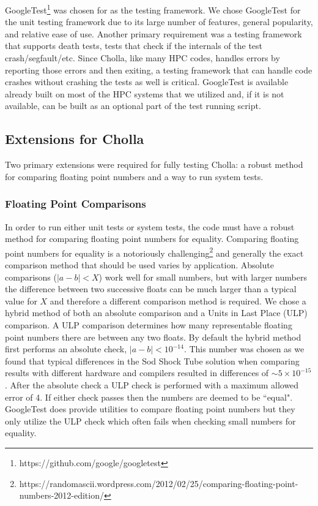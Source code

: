 GoogleTest\footnote{https://github.com/google/googletest} was chosen for as the testing framework. We chose GoogleTest for the unit testing framework due to its large number of features, general popularity, and relative ease of use. Another primary requirement was a testing framework that supports death tests, tests that check if the internals of the test crash/segfault/etc. Since Cholla, like many HPC codes, handles errors by reporting those errors and then exiting, a testing framework that can handle code crashes without crashing the tests as well is critical. GoogleTest is available already built on most of the HPC systems that we utilized and, if it is not available, can be built as an optional part of the test running script.

\subsection{Extensions for Cholla}

Two primary extensions were required for fully testing Cholla: a robust method for comparing floating point numbers and a way to run system tests.

\subsubsection{Floating Point Comparisons}
\label{sec:fp-comparing}

In order to run either unit tests or system tests, the code must have a robust method for comparing floating point numbers for equality. Comparing floating point numbers for equality is a notoriously challenging\footnote{https://randomascii.wordpress.com/2012/02/25/comparing-floating-point-numbers-2012-edition/} and generally the exact comparison method that should be used varies by application. Absolute comparisons ($|a-b| < X$) work well for small numbers, but with larger numbers the difference between two successive floats can be much larger than a typical value for $X$ and therefore a different comparison method is required. We chose a hybrid method of both an absolute comparison and a Units in Last Place (ULP) comparison. A ULP comparison determines how many representable floating point numbers there are between any two floats. By default the hybrid method first performs an absolute check, $|a-b| < 10^{-14}$. This number was chosen as we found that typical differences in the Sod Shock Tube solution when comparing results with different hardware and compilers resulted in differences of $\sim5\times10^{-15}$. After the absolute check a ULP check is performed with a maximum allowed error of 4. If either check passes then the numbers are deemed to be ``equal". GoogleTest does provide utilities to compare floating point numbers but they only utilize the ULP check which often fails when checking small numbers for equality.

